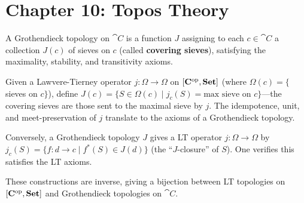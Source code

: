 \section*{Chapter 10: Topos Theory}

\begin{exercise}
A Grothendieck topology on $\cat{C}$ is a function $J$ assigning to each $c \in \cat{C}$ a collection $J(c)$ of sieves on $c$ (called \textbf{covering sieves}), satisfying the maximality, stability, and transitivity axioms.

Given a Lawvere-Tierney operator $j: \Omega \to \Omega$ on $[\mathbf{C}^{\mathrm{op}}, \mathbf{Set}]$ (where $\Omega(c) = \{$ sieves on $c \}$), define $J(c) = \{S \in \Omega(c) \mid j_c(S) = \text{max sieve on } c\}$—the covering sieves are those sent to the maximal sieve by $j$. The idempotence, unit, and meet-preservation of $j$ translate to the axioms of a Grothendieck topology.

Conversely, a Grothendieck topology $J$ gives a LT operator $j: \Omega \to \Omega$ by $j_c(S) = \{f: d \to c \mid f^*(S) \in J(d)\}$ (the ``$J$-closure'' of $S$). One verifies this satisfies the LT axioms.

These constructions are inverse, giving a bijection between LT topologies on $[\mathbf{C}^{\mathrm{op}},\mathbf{Set}]$ and Grothendieck topologies on $\cat{C}$.
\end{exercise}

